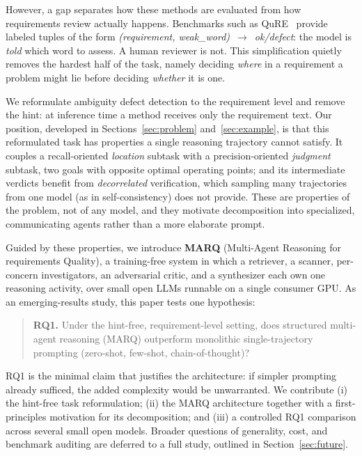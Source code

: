 \documentclass[10pt,conference]{IEEEtran}
\begin{document}
However, a gap separates how these methods are evaluated from how requirements review actually happens. Benchmarks such as QuRE~\cite{qure} provide labeled tuples of the form \emph{(requirement, weak\_word)}~$\rightarrow$~\emph{ok/defect}: the model is \emph{told} which word to assess. A human reviewer is not. This simplification quietly removes the hardest half of the task, namely deciding \emph{where} in a requirement a problem might lie before deciding \emph{whether} it is one.

We reformulate ambiguity defect detection to the requirement level and remove the hint: at inference time a method receives only the requirement text. Our position, developed in Sections~\ref{sec:problem} and~\ref{sec:example}, is that this reformulated task has properties a single reasoning trajectory cannot satisfy. It couples a recall-oriented \emph{location} subtask with a precision-oriented \emph{judgment} subtask, two goals with opposite optimal operating points; and its intermediate verdicts benefit from \emph{decorrelated} verification, which sampling many trajectories from one model (as in self-consistency) does not provide. These are properties of the problem, not of any model, and they motivate decomposition into specialized, communicating agents rather than a more elaborate prompt.

Guided by these properties, we introduce \textbf{MARQ} (Multi-Agent Reasoning for requirements Quality), a training-free system in which a retriever, a scanner, per-concern investigators, an adversarial critic, and a synthesizer each own one reasoning activity, over small open LLMs runnable on a single consumer GPU. As an emerging-results study, this paper tests one hypothesis:

\begin{quote}
\textbf{RQ1.} Under the hint-free, requirement-level setting, does structured multi-agent reasoning (MARQ) outperform monolithic single-trajectory prompting (zero-shot, few-shot, chain-of-thought)?
\end{quote}

RQ1 is the minimal claim that justifies the architecture: if simpler prompting already sufficed, the added complexity would be unwarranted. We contribute (i) the hint-free task reformulation; (ii) the MARQ architecture together with a first-principles motivation for its decomposition; and (iii) a controlled RQ1 comparison across several small open models. Broader questions of generality, cost, and benchmark auditing are deferred to a full study, outlined in Section~\ref{sec:future}.
\end{document}
